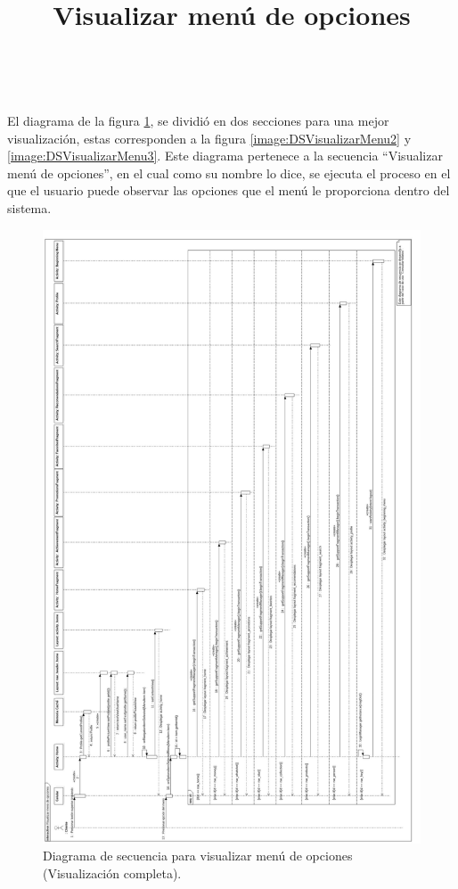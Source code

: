\title{\textbf{Visualizar menú de opciones}}
\\ \par
El diagrama de la figura \ref{image:DSvisualizarMenu1}, se dividió en dos secciones para una mejor visualización, estas corresponden a la figura \ref{image:DSVisualizarMenu2} y \ref{image:DSVisualizarMenu3}. Este diagrama pertenece a la secuencia ``Visualizar menú de opciones'', en el cual como su nombre lo dice, se ejecuta el proceso en el que el usuario puede observar las opciones que el menú le proporciona dentro del sistema.
\FloatBarrier
\begin{figure}[htbp!]
		\centering
			\includegraphics[width=.68 \textwidth]{imagenes/Diagramas_UserApp/Nuevos_diagramas/Horizontal/visualizarMenu}
		\caption{Diagrama de secuencia para visualizar menú de opciones (Visualización completa).}
		\label{image:DSvisualizarMenu1}
\end{figure}
\FloatBarrier


